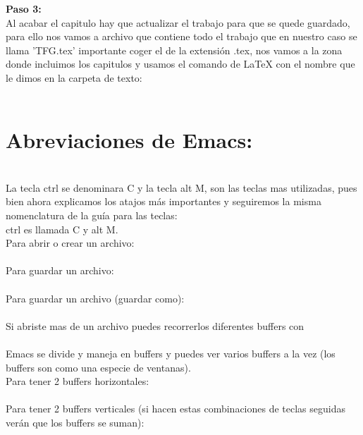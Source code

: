 \textbf{Paso 3:}\\
Al acabar el capitulo hay que actualizar el trabajo para que se quede guardado, para ello nos vamos a archivo que contiene todo el trabajo que en nuestro caso se llama 'TFG.tex' importante coger el de la extensión .tex, nos vamos a la zona donde incluimos los capitulos y usamos el comando de LaTeX con el nombre que le dimos en la carpeta de texto:\\

\\



\section{Abreviaciones de Emacs:}\\

La tecla ctrl se denominara C y la tecla alt M, son las teclas mas utilizadas, pues bien ahora explicamos los atajos más importantes y seguiremos la misma nomenclatura de la guía para las teclas:\\

ctrl es llamada C y alt M.\\

Para abrir o crear un archivo:\\
\\

Para guardar un archivo:\\
\\

Para guardar un archivo (guardar como):\\
\\

Si abriste mas de un archivo puedes recorrerlos diferentes buffers con\\
\\

Emacs se divide y maneja en buffers y puedes ver varios buffers a la vez (los buffers son como una especie de ventanas).\\

Para tener 2 buffers horizontales:\\
\\

Para tener 2 buffers verticales (si hacen estas combinaciones de teclas seguidas verán que los buffers se suman):\\
\\

